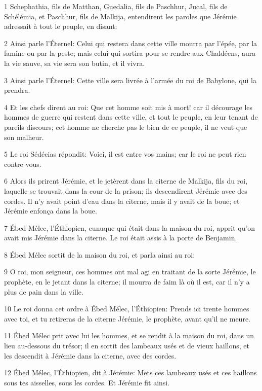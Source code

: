 \par 1 Schephathia, fils de Matthan, Guedalia, fils de Paschhur, Jucal, fils de Schélémia, et Paschhur, fils de Malkija, entendirent les paroles que Jérémie adressait à tout le peuple, en disant:
\par 2 Ainsi parle l'Éternel: Celui qui restera dans cette ville mourra par l'épée, par la famine ou par la peste; mais celui qui sortira pour se rendre aux Chaldéens, aura la vie sauve, sa vie sera son butin, et il vivra.
\par 3 Ainsi parle l'Éternel: Cette ville sera livrée à l'armée du roi de Babylone, qui la prendra.
\par 4 Et les chefs dirent au roi: Que cet homme soit mis à mort! car il décourage les hommes de guerre qui restent dans cette ville, et tout le peuple, en leur tenant de pareils discours; cet homme ne cherche pas le bien de ce peuple, il ne veut que son malheur.
\par 5 Le roi Sédécias répondit: Voici, il est entre vos mains; car le roi ne peut rien contre vous.
\par 6 Alors ils prirent Jérémie, et le jetèrent dans la citerne de Malkija, fils du roi, laquelle se trouvait dans la cour de la prison; ils descendirent Jérémie avec des cordes. Il n'y avait point d'eau dans la citerne, mais il y avait de la boue; et Jérémie enfonça dans la boue.
\par 7 Ébed Mélec, l'Éthiopien, eunuque qui était dans la maison du roi, apprit qu'on avait mis Jérémie dans la citerne. Le roi était assis à la porte de Benjamin.
\par 8 Ébed Mélec sortit de la maison du roi, et parla ainsi au roi:
\par 9 O roi, mon seigneur, ces hommes ont mal agi en traitant de la sorte Jérémie, le prophète, en le jetant dans la citerne; il mourra de faim là où il est, car il n'y a plus de pain dans la ville.
\par 10 Le roi donna cet ordre à Ébed Mélec, l'Éthiopien: Prends ici trente hommes avec toi, et tu retireras de la citerne Jérémie, le prophète, avant qu'il ne meure.
\par 11 Ébed Mélec prit avec lui les hommes, et se rendit à la maison du roi, dans un lieu au-dessous du trésor; il en sortit des lambeaux usés et de vieux haillons, et les descendit à Jérémie dans la citerne, avec des cordes.
\par 12 Ébed Mélec, l'Éthiopien, dit à Jérémie: Mets ces lambeaux usés et ces haillons sous tes aisselles, sous les cordes. Et Jérémie fit ainsi.
